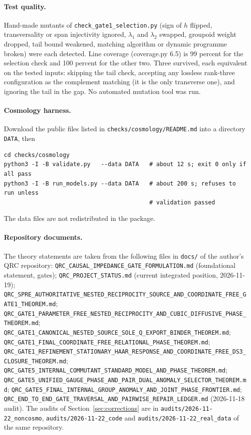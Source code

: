 \documentclass[11pt]{article}
\theoremstyle{definition}
\theoremstyle{remark}
\newcommand{\doc}[1]{\nolinkurl{#1}}
\begin{document}
\paragraph{Test quality.} Hand-made mutants of \texttt{check\_gate1\_selection.py}
(sign of $h$ flipped, transversality or span injectivity ignored, $\lambda_1$ and
$\lambda_2$ swapped, groupoid weight dropped, tail bound weakened, matching algorithm or
dynamic programme broken) were each detected. Line coverage (coverage.py 6.5) is
99 percent for the selection check and 100 percent for the other two. Three survived, each equivalent on the
tested inputs: skipping the tail check, accepting any lossless rank-three configuration
as the complement matching (it is the only transverse one), and ignoring the tail in the
gap. No automated mutation tool was run.

\paragraph{Cosmology harness.} Download the public files listed in
\texttt{checks/cosmology/README.md} into a directory \texttt{DATA}, then
\begin{verbatim}
cd checks/cosmology
python3 -I -B validate.py   --data DATA   # about 12 s; exit 0 only if all pass
python3 -I -B run_models.py --data DATA   # about 200 s; refuses to run unless
                                          # validation passed
\end{verbatim}
The data files are not redistributed in the package.

\paragraph{Repository documents.} The theory statements are taken from the following
files in \texttt{docs/} of the author's QRC repository: {\footnotesize
\doc{QRC_CAUSAL_IMPEDANCE_GATE_FORMULATION.md} (foundational statement, gates);
\doc{QRC_PROJECT_STATUS.md} (current integrated position, 2026-11-19);
\doc{QRC_SPRE_AUTHORITATIVE_NESTED_RECIPROCITY_SOURCE_AND_COORDINATE_FREE_GATE1_THEOREM.md};
\doc{QRC_GATE1_PARAMETER_FREE_NESTED_RECIPROCITY_AND_CUBIC_DIFFUSIVE_PHASE_THEOREM.md};
\doc{QRC_GATE1_CANONICAL_NESTED_SOURCE_SOLE_Q_EXPORT_BINDER_THEOREM.md};
\doc{QRC_GATE1_FINAL_COORDINATE_FREE_RELATIONAL_PHASE_THEOREM.md};
\doc{QRC_GATE1_REFINEMENT_STATIONARY_HAAR_RESPONSE_AND_COORDINATE_FREE_DS3_CLOSURE_THEOREM.md};
\doc{QRC_GATE5_INTERNAL_COMMUTANT_STANDARD_MODEL_AND_PHASE_THEOREM.md};
\doc{QRC_GATE5_UNIFIED_GAUGE_PHASE_AND_PAIR_DUAL_ANOMALY_SELECTOR_THEOREM.md};
\doc{QRC_GATE5_FINAL_INTERNAL_GROUP_ANOMALY_AND_JOINT_PHASE_FRONTIER.md};
\doc{QRC_END_TO_END_GATE_TRAVERSAL_AND_PAIRWISE_REPAIR_LEDGER.md} (2026-11-18 audit).}
The audits of Section~\ref{sec:corrections} are in \texttt{audits/2026-11-22\_noncosmo},
\texttt{audits/2026-11-22\_code} and \texttt{audits/2026-11-22\_real\_data} of the same
repository.
\end{document}

